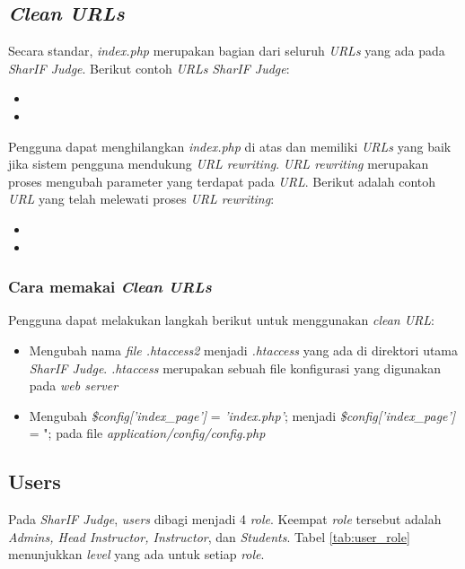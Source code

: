\subsection{\textit{Clean URLs}}
\label{subsec:clean_urls}
Secara standar, \textit{index.php} merupakan bagian dari seluruh \textit{URLs} yang ada pada \textit{SharIF Judge}. Berikut contoh \textit{URLs} \textit{SharIF Judge}:

\begin{itemize}
	\item {}
	\item {}
\end{itemize}

Pengguna dapat menghilangkan \textit{index.php} di atas dan memiliki \textit{URLs} yang baik jika sistem pengguna mendukung \textit{URL rewriting}. \textit{URL rewriting} merupakan proses mengubah parameter yang terdapat pada \textit{URL}. Berikut adalah contoh \textit{URL} yang telah melewati proses \textit{URL rewriting}:

\begin{itemize}
	\item {}
	\item {}
\end{itemize}

\subsubsection{Cara memakai \textit{Clean URLs}}
\label{subsubsec:clean_urls}
Pengguna dapat melakukan langkah berikut untuk menggunakan \textit{clean URL}:
\begin{itemize}
	\item Mengubah nama \textit{file .htaccess2} menjadi \textit{.htaccess} yang ada di direktori utama \textit{SharIF Judge}. \textit{.htaccess} merupakan sebuah file konfigurasi yang digunakan pada \textit{web server}
	\item Mengubah \textit{\$config['index\_page']} = \textit{'index.php'}; menjadi\textit{ \$config['index\_page']} = "; pada file \textit{application/config/config.php}
\end{itemize} 

\subsection{Users}
\label{subsec:users}
Pada \textit{SharIF Judge}, \textit{users} dibagi menjadi 4 \textit{role}. Keempat \textit{role} tersebut adalah \textit{Admins, Head Instructor, Instructor}, dan \textit{Students}. Tabel \ref{tab:user_role} menunjukkan \textit{level} yang ada untuk setiap \textit{role}.


